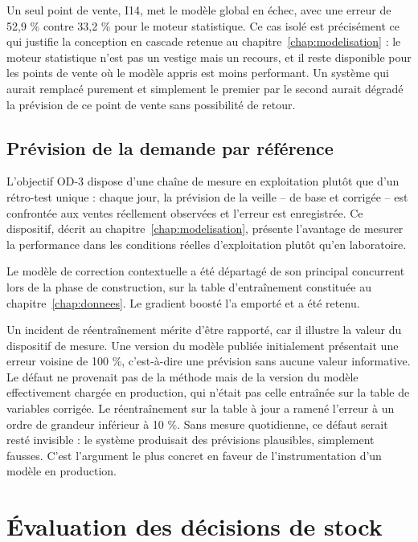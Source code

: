 Un seul point de vente, I14, met le modèle global en échec, avec une erreur de 52,9 \% contre 33,2 \% pour le moteur statistique. Ce cas isolé est précisément ce qui justifie la conception en cascade retenue au chapitre~\ref{chap:modelisation} : le moteur statistique n'est pas un vestige mais un recours, et il reste disponible pour les points de vente où le modèle appris est moins performant. Un système qui aurait remplacé purement et simplement le premier par le second aurait dégradé la prévision de ce point de vente sans possibilité de retour.

\subsection{Prévision de la demande par référence}

L'objectif OD-3 dispose d'une chaîne de mesure en exploitation plutôt que d'un rétro-test unique : chaque jour, la prévision de la veille -- de base et corrigée -- est confrontée aux ventes réellement observées et l'erreur est enregistrée. Ce dispositif, décrit au chapitre~\ref{chap:modelisation}, présente l'avantage de mesurer la performance dans les conditions réelles d'exploitation plutôt qu'en laboratoire.

Le modèle de correction contextuelle a été départagé de son principal concurrent lors de la phase de construction, sur la table d'entraînement constituée au chapitre~\ref{chap:donnees}. Le gradient boosté l'a emporté et a été retenu.

Un incident de réentraînement mérite d'être rapporté, car il illustre la valeur du dispositif de mesure. Une version du modèle publiée initialement présentait une erreur voisine de 100 \%, c'est-à-dire une prévision sans aucune valeur informative. Le défaut ne provenait pas de la méthode mais de la version du modèle effectivement chargée en production, qui n'était pas celle entraînée sur la table de variables corrigée. Le réentraînement sur la table à jour a ramené l'erreur à un ordre de grandeur inférieur à 10 \%. Sans mesure quotidienne, ce défaut serait resté invisible : le système produisait des prévisions plausibles, simplement fausses. C'est l'argument le plus concret en faveur de l'instrumentation d'un modèle en production.

\section{Évaluation des décisions de stock}
\label{sec:eval-stock}

